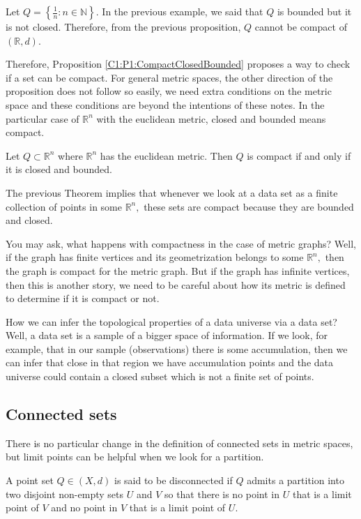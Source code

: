 \documentclass[
	fontsize=10pt, %
	twoside=false, %
	secnumdepth=1, %
]{kaobook}
\begin{document}
\begin{example}
Let $Q=\left\{\frac{1}{n}: n\in\mathbb{N}\right\}.$ In the previous example, we said that $Q$ is bounded but it is not closed. Therefore, from the previous proposition, $Q$ cannot be compact of $(\mathbb{R},d).$
\end{example}

Therefore, Proposition \ref{C1:P1:CompactClosedBounded} proposes a way to check if a set can be compact. For general metric spaces, the other direction of the proposition does not follow so easily, we need extra conditions on the metric space and these conditions are beyond the intentions of these notes. In the particular case of $\mathbb{R}^n$ with the euclidean metric, closed and bounded means compact.

\begin{theorem}
Let $Q\subset \mathbb{R}^n$ where $\mathbb{R}^n$ has the euclidean metric. Then $Q$ is compact if and only if it is closed and bounded.
\end{theorem}

The previous Theorem implies that whenever we look at a data set as a finite collection of points in some $\mathbb{R}^n,$ these sets are compact because they are bounded and closed.

You may ask, what happens with compactness in the case of metric graphs? Well, if the graph has finite vertices and its geometrization belongs to some $\mathbb{R}^n,$ then the graph is compact for the metric graph. But if the graph has infinite vertices, then this is another story, we need to be careful about how its metric is defined to determine if it is compact or not.

How we can infer the topological properties of a data universe via a data set? Well, a data set is a sample of a bigger space of information. If we look, for example, that in our sample (observations) there is some accumulation, then we can infer that close in that region we have accumulation points and the data universe could contain a closed subset which is not a finite set of points.

\subsection{Connected sets}

There is no particular change in the definition of connected sets in metric spaces, but limit points can be helpful when we look for a partition.

\begin{definition}
A point set $Q\in (X,d)$ is said to be disconnected if $Q$ admits a partition into two disjoint non-empty sets $U$ and $V$ so that there is no point in $U$ that is a limit point of $V$ and no point in $V$ that is a limit point of $U.$
\end{definition}
\end{document}
